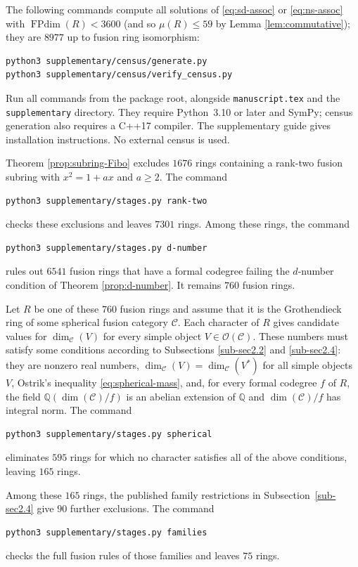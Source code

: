\documentclass[11pt]{amsart}
\theoremstyle{definition}
\DeclareMathOperator{\FPdim}{FPdim}
\newcommand{\Q}{\mathbb Q}
\numberwithin{equation}{section}
\begin{document}
The following commands compute all solutions of \eqref{eq:sd-assoc} or \eqref{eq:ns-assoc} with $\FPdim(R)<3600$ (and so $\mu(R)\leq 59$ by Lemma \ref{lem:commutative}); they are $8977$ up to fusion ring isomorphism:
\begin{verbatim}
python3 supplementary/census/generate.py   
python3 supplementary/census/verify_census.py 
\end{verbatim}

Run all commands from the package root, alongside
\texttt{manuscript.tex} and the \texttt{supplementary} directory.
They require Python~3.10 or later and SymPy; census generation also
requires a C++17 compiler. The supplementary guide gives installation
instructions. No external census is used.

Theorem \ref{prop:subring-Fibo} excludes $1676$ rings containing a rank-two fusion subring with $x^2=1+ax$ and $a\geq2$.
The command
\begin{verbatim}
python3 supplementary/stages.py rank-two
\end{verbatim}
checks these exclusions and leaves $7301$ rings.
Among these rings, the command
\begin{verbatim}
python3 supplementary/stages.py d-number
\end{verbatim}
rules out $6541$ fusion rings that have a formal codegree failing the
$d$-number condition of Theorem \ref{prop:d-number}. 
It remains $760$ fusion rings.

Let $R$ be one of these $760$ fusion rings and assume that it is the Grothendieck ring of some spherical fusion category $\mathcal{C}$. 
Each character of $R$ gives candidate values for $\dim_\mathcal{C}(V)$ for every simple object $V\in \mathcal{O}(\mathcal{C})$. 
These numbers must satisfy some conditions according to Subsections \ref{sub-sec2.2} and \ref{sub-sec2.4}: they are nonzero real numbers, $\dim_\mathcal{C}(V)=\dim_\mathcal{C}(V^*)$ for all simple objects $V$, Ostrik's inequality \eqref{eq:spherical-mass}, and, for every formal codegree $f$ of $R$, the field $\Q(\dim(\mathcal{C})/f)$ is an abelian extension of $\Q$ and $\dim(\mathcal{C})/f$ has integral norm. 
The command
\begin{verbatim}
python3 supplementary/stages.py spherical
\end{verbatim}
eliminates $595$ rings for which no character satisfies all of the above conditions, leaving $165$ rings.


Among these $165$ rings, the published family restrictions in
Subsection~\ref{sub-sec2.4} give $90$ further exclusions. The command
\begin{verbatim}
python3 supplementary/stages.py families
\end{verbatim}
checks the full fusion rules of those families and leaves $75$ rings.
\end{document}
